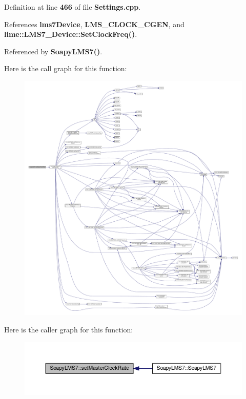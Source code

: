 Definition at line {\bf 466} of file {\bf Settings.\+cpp}.



References {\bf lms7\+Device}, {\bf L\+M\+S\+\_\+\+C\+L\+O\+C\+K\+\_\+\+C\+G\+EN}, and {\bf lime\+::\+L\+M\+S7\+\_\+\+Device\+::\+Set\+Clock\+Freq()}.



Referenced by {\bf Soapy\+L\+M\+S7()}.



Here is the call graph for this function\+:
\nopagebreak
\begin{figure}[H]
\begin{center}
\leavevmode
\includegraphics[width=350pt]{d9/d90/classSoapyLMS7_aad0f89a59ee147487cf243ccb3ff94d5_cgraph}
\end{center}
\end{figure}




Here is the caller graph for this function\+:
\nopagebreak
\begin{figure}[H]
\begin{center}
\leavevmode
\includegraphics[width=350pt]{d9/d90/classSoapyLMS7_aad0f89a59ee147487cf243ccb3ff94d5_icgraph}
\end{center}
\end{figure}



